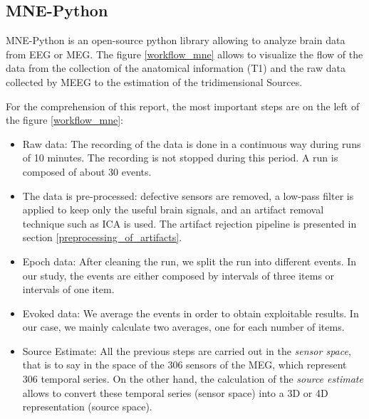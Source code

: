 \subsection{MNE-Python}
 
MNE-Python \cite{GramfortEtAl2013a} is an open-source python library allowing to analyze brain data from EEG or MEG. The figure \ref{workflow_mne} allows to visualize the flow of the data from the collection of the anatomical information (T1) and the raw data collected by MEEG to the estimation of the tridimensional Sources.
 
For the comprehension of this report, the most important steps are on the left of the figure \ref{workflow_mne}:
 
\begin{itemize}
   \item Raw data: The recording of the data is done in a continuous way during runs of 10 minutes. The recording is not stopped during this period. A run is composed of about 30 events.
   \item The data is pre-processed: defective sensors are removed, a low-pass filter is applied to keep only the useful brain signals, and an artifact removal technique such as ICA is used. The artifact rejection pipeline is presented in section \ref{preprocessing_of_artifacts}.
   \item Epoch data: After cleaning the run, we split the run into different events. In our study, the events are either composed by intervals of three items or intervals of one item.
   \item Evoked data: We average the events in order to obtain exploitable results. In our case, we mainly calculate two averages, one for each number of items.
   \item Source Estimate: All the previous steps are carried out in the \textit{sensor space}, that is to say in the space of the 306 sensors of the MEG, which represent 306 temporal series. On the other hand, the calculation of the \textit{source estimate} allows to convert these temporal series (sensor space) into a 3D or 4D representation (source space).
\end{itemize}
 
